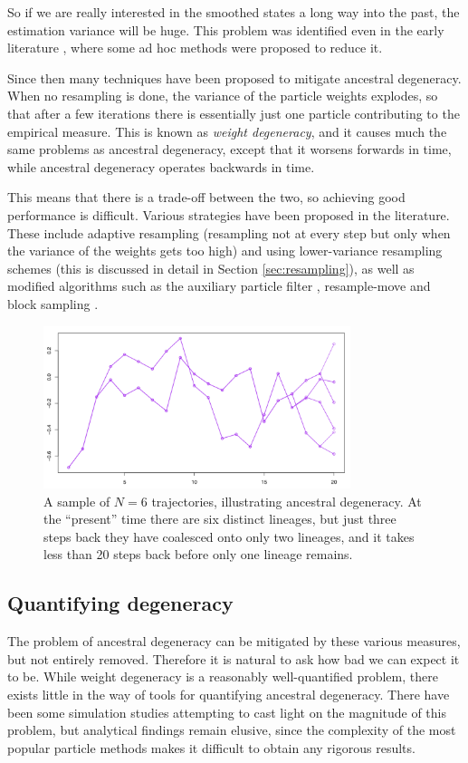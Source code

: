 \documentclass[fleqn]{article}
\theoremstyle{definition}
\begin{document}
So if we are really interested in the smoothed states a long way into the past, the estimation variance will be huge. This problem was identified even in the early literature \citep{gordon1993}, where some ad hoc methods were proposed to reduce it.

Since then many techniques have been proposed to mitigate ancestral degeneracy.
When no resampling is done, the variance of the particle weights explodes, so that  after a few iterations there is essentially just one particle contributing to the empirical measure. This is known as \emph{weight degeneracy}, and it causes much the same problems as ancestral degeneracy, except that it worsens forwards in time, while ancestral degeneracy operates backwards in time.

This means that there is a trade-off between the two, so achieving good performance is difficult. Various strategies have been proposed in the literature.
These include adaptive resampling (resampling not at every step but only when the variance of the weights gets too high) and using lower-variance resampling schemes (this is discussed in detail in Section \ref{sec:resampling}), as well as modified algorithms such as the auxiliary particle filter \citep{pitt1999}, resample-move \citep{gilks2001} and block sampling \citep{doucet2006}.

\begin{figure}
\centering
\includegraphics[width=0.8\textwidth]{degeneracy.pdf}
\caption{A sample of $N=6$ trajectories, illustrating ancestral degeneracy. At the ``present'' time there are six distinct lineages, but just three steps back they have coalesced onto only two lineages, and it takes less than 20 steps back before only one lineage remains.}
\label{fig:degeneracy}
\end{figure}

\subsection{Quantifying degeneracy}
The problem of ancestral degeneracy can be mitigated by these various measures, but not entirely removed. Therefore it is natural to ask how bad we can expect it to be. While weight degeneracy is a reasonably well-quantified problem, there exists little in the way of tools for quantifying ancestral degeneracy. There have been some simulation studies attempting to cast light on the magnitude of this problem, but analytical findings remain elusive, since the complexity of the most popular particle methods makes it difficult to obtain any rigorous results.
\end{document}
